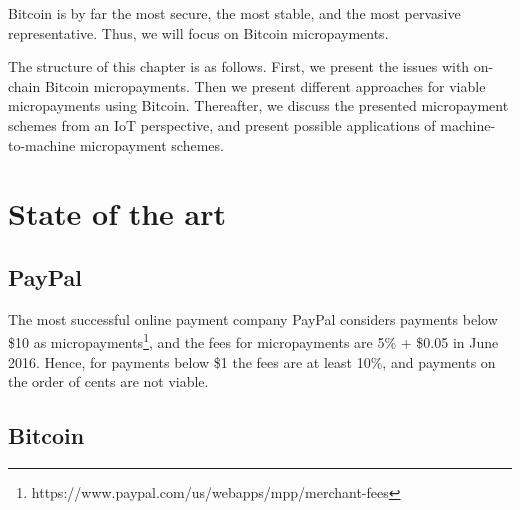 Bitcoin is by far the most secure, the most stable, and the most pervasive representative. Thus, we will focus on Bitcoin micropayments.

The structure of this chapter is as follows. First, we present the issues with on-chain Bitcoin micropayments. Then we present different approaches for viable micropayments using Bitcoin. Thereafter, we discuss the presented micropayment schemes from an IoT perspective, and present possible applications of machine-to-machine micropayment schemes.


\section{State of the art}

\subsection{PayPal}

The most successful online payment company PayPal considers payments below \$10 as micropayments\footnote{https://www.paypal.com/us/webapps/mpp/merchant-fees}, and the fees for micropayments are 5\% + \$0.05 in June 2016. Hence, for payments below \$1 the fees are at least 10\%, and payments on the order of cents are not viable.

\subsection{Bitcoin} 

